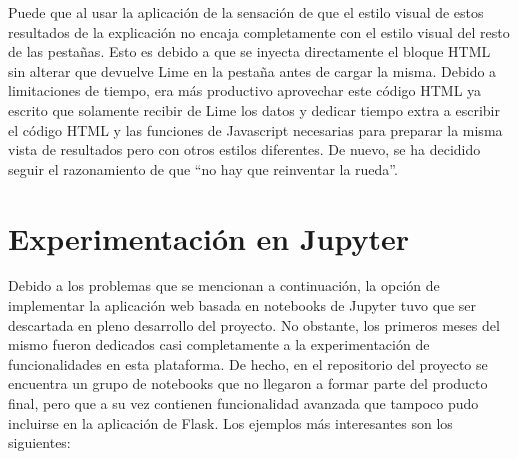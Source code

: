 Puede que al usar la aplicación de la sensación de que el estilo visual de estos resultados de la explicación no encaja completamente con el estilo visual del resto de las pestañas. Esto es debido a que se inyecta directamente el bloque HTML sin alterar que devuelve Lime en la pestaña antes de cargar la misma. Debido a limitaciones de tiempo, era más productivo aprovechar este código HTML ya escrito que solamente recibir de Lime los datos y dedicar tiempo extra a escribir el código HTML y las funciones de Javascript necesarias para preparar la misma vista de resultados pero con otros estilos diferentes. De nuevo, se ha decidido seguir el razonamiento de que ``no hay que reinventar la rueda''.

\section{Experimentación en Jupyter}

Debido a los problemas que se mencionan a continuación, la opción de implementar la aplicación web basada en notebooks de Jupyter tuvo que ser descartada en pleno desarrollo del proyecto.
No obstante, los primeros meses del mismo fueron dedicados casi completamente a la experimentación de funcionalidades en esta plataforma. De hecho, en el repositorio del proyecto se encuentra un grupo de notebooks que no llegaron a formar parte del producto final, pero que a su vez contienen funcionalidad avanzada que tampoco pudo incluirse en la aplicación de Flask. Los ejemplos más interesantes son los siguientes:

